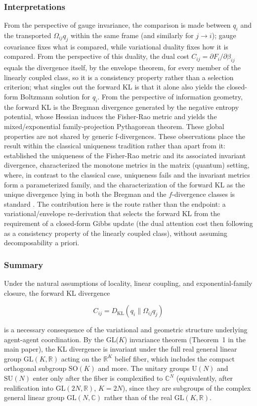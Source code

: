 \documentclass[twoside,11pt]{article}
\begin{document}
\subsubsection{Interpretations}
From the perspective of gauge invariance, the comparison is made between $q_i$ and the transported $\Omega_{ij}q_j$ within the same frame (and similarly for $j \rightarrow i$); gauge covariance fixes what is compared, while variational duality fixes how it is compared. From the perspective of this duality, the dual cost $C_{ij} = \partial F_i / \partial \beta_{ij}$ equals the divergence itself, by the envelope theorem, for every member of the linearly coupled class, so it is a consistency property rather than a selection criterion; what singles out the forward KL is that it alone also yields the closed-form Boltzmann solution for $q_i$. From the perspective of information geometry, the forward KL is the Bregman divergence generated by the negative entropy potential, whose Hessian induces the Fisher-Rao metric and yields the mixed/exponential family-projection Pythagorean theorem. These global properties are not shared by generic f-divergences. These observations place the result within the classical uniqueness tradition rather than apart from it: \citet{Cencov1982} established the uniqueness of the Fisher-Rao metric and its associated invariant divergence, \citet{Petz1996} characterized the monotone metrics in the matrix (quantum) setting, where, in contrast to the classical case, uniqueness fails and the invariant metrics form a parameterized family, and the characterization of the forward KL as the unique divergence lying in both the Bregman and the $f$-divergence classes is standard \citep{Amari2016}. The contribution here is the route rather than the endpoint: a variational/envelope re-derivation that selects the forward KL from the requirement of a closed-form Gibbs update (the dual attention cost then following as a consistency property of the linearly coupled class), without assuming decomposability a priori.

\subsubsection{Summary}
Under the natural assumptions of locality, linear coupling, and exponential-family closure, the forward KL divergence

\[
\boxed{
C_{ij}=D_{\mathrm{KL}}(q_i \| \Omega_{ij} q_j)}
\]

is a necessary consequence of the variational and geometric structure underlying agent-agent coordination. By the GL($K$) invariance theorem (Theorem~1 in the main paper), the KL divergence is invariant under the full real general linear group $\mathrm{GL}(K,\mathbb{R})$ acting on the $\mathbb{R}^K$ belief fiber, which includes the compact orthogonal subgroup $\mathrm{SO}(K)$ and more. The unitary groups $\mathrm{U}(N)$ and $\mathrm{SU}(N)$ enter only after the fiber is complexified to $\mathbb{C}^N$ (equivalently, after realification into $\mathrm{GL}(2N,\mathbb{R})$, $K=2N$), since they are subgroups of the complex general linear group $\mathrm{GL}(N,\mathbb{C})$ rather than of the real $\mathrm{GL}(K,\mathbb{R})$.
\end{document}

